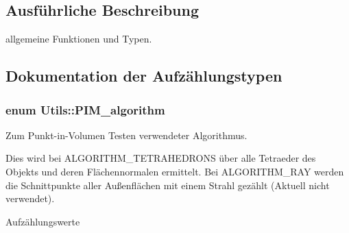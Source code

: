 \subsection{Ausführliche Beschreibung}
allgemeine Funktionen und Typen. 

\subsection{Dokumentation der Aufzählungstypen}
\hypertarget{namespaceUtils_ad369b0127cabda0d6871ce1ae7e6c862}{
\subsubsection[{P\-I\-M\-\_\-algorithm}]{\setlength{\rightskip}{0pt plus 5cm}enum {\bf Utils\-::\-P\-I\-M\-\_\-algorithm}}}\label{namespaceUtils_ad369b0127cabda0d6871ce1ae7e6c862}


Zum Punkt-\/in-\/\-Volumen Testen verwendeter Algorithmus. 

Dies wird bei A\-L\-G\-O\-R\-I\-T\-H\-M\-\_\-\-T\-E\-T\-R\-A\-H\-E\-D\-R\-O\-N\-S über alle Tetraeder des Objekts und deren Flächennormalen ermittelt. Bei A\-L\-G\-O\-R\-I\-T\-H\-M\-\_\-\-R\-A\-Y werden die Schnittpunkte aller Außenflächen mit einem Strahl gezählt (Aktuell nicht verwendet). \begin{Desc}
\item[Aufzählungswerte]\par
\begin{description}
\item[{\em 
\hypertarget{namespaceUtils_ad369b0127cabda0d6871ce1ae7e6c862a68e0a4da7ea369e1ba873c380926f010}{A\-L\-G\-O\-R\-I\-T\-H\-M\-\_\-\-T\-E\-T\-R\-A\-H\-E\-D\-R\-O\-N\-S}\label{namespaceUtils_ad369b0127cabda0d6871ce1ae7e6c862a68e0a4da7ea369e1ba873c380926f010}
}]\item[{\em 
\hypertarget{namespaceUtils_ad369b0127cabda0d6871ce1ae7e6c862a4606bd560af1a6fd19e854e13613e9d0}{A\-L\-G\-O\-R\-I\-T\-H\-M\-\_\-\-R\-A\-Y}\label{namespaceUtils_ad369b0127cabda0d6871ce1ae7e6c862a4606bd560af1a6fd19e854e13613e9d0}
}]\end{description}
\end{Desc}


